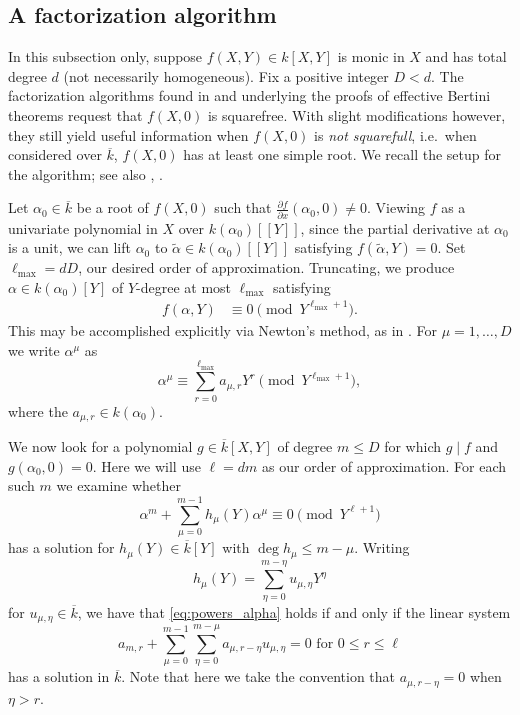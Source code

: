 \documentclass{amsart}
\newcommand{\lmax}{\ell_{\max}}
\theoremstyle{definition}
\numberwithin{equation}{section}
\numberwithin{table}{section}
\begin{document}
\subsection{A factorization algorithm}
\label{sec:factorization_alg}

In this subsection only, suppose $f(X,Y) \in k[X,Y]$ is monic in $X$ and has total degree $d$ (not necessarily homogeneous). Fix a positive integer $D < d$. The factorization algorithms found in \cite{Kaltofen} and \cite[\S 3.1]{CafureMatera} underlying the proofs of effective Bertini theorems \cite[Corollaries 3.2, 3.3]{CafureMatera} request that $f(X,0)$ is squarefree. With slight modifications however, they still yield useful information when $f(X,0)$ is \textit{not squarefull}, i.e.\ when considered over $\overline{k}$, $f(X,0)$ has at least one simple root. We recall the setup for the algorithm; see also \cite[\S 1]{Kaltofen}, \cite[\S 3.1]{CafureMatera}.

Let $\alpha_0 \in \overline{k}$ be a root of $f(X,0)$ such that $\frac{\partial f}{\partial x}(\alpha_0, 0) \neq 0$. Viewing $f$ as a univariate polynomial in $X$ over $k(\alpha_0)[[Y]]$, since the partial derivative at $\alpha_0$ is a unit, we can lift $\alpha_0$ to $\widetilde{\alpha} \in k(\alpha_0)[[Y]]$ satisfying $f(\widetilde{\alpha}, Y) = 0$. Set $\lmax = dD$, our desired order of approximation. Truncating, we produce $\alpha \in k(\alpha_0)[Y]$ of $Y$-degree at most $\lmax$ satisfying
\begin{align*}
	f(\alpha, Y) &\equiv 0 \pmod{Y^{\lmax + 1}}.
\end{align*}
This may be accomplished explicitly via Newton's method, as in \cite{Kaltofen, CafureMatera}. For $\mu = 1, \ldots, D$ we write $\alpha^\mu$ as
\[\alpha^\mu \equiv \sum_{r=0}^{\lmax} a_{\mu, r} Y^r \pmod{Y^{\lmax+1}},\]
where the $a_{\mu, r} \in k(\alpha_0)$. 

We now look for a polynomial $g \in\overline{k}[X,Y]$ of degree $m \leq D$ for which $g \mid f$ and $g(\alpha_0,0) = 0$. Here we will use $\ell = dm$ as our order of approximation. For each such $m$ we examine whether
\begin{equation}\label{eq:powers_alpha}
	\alpha^m + \sum_{\mu=0}^{m-1} h_\mu(Y)\alpha^\mu \equiv 0 \pmod{Y^{\ell + 1}}
\end{equation}
has a solution for $h_\mu(Y) \in \overline{k}[Y]$ with $\deg h_\mu \leq m-\mu$. Writing
\[h_\mu(Y) = \sum_{\eta=0}^{m-\eta} u_{\mu,\eta}Y^\eta\]
for $u_{\mu,\eta} \in \overline{k}$, we have that \eqref{eq:powers_alpha} holds if and only if the linear system
\begin{equation}\label{eq:linear system}
	a_{m,r} + \sum_{\mu=0}^{m-1} \sum_{\eta=0}^{m-\mu} a_{\mu, r-\eta}u_{\mu,\eta} = 0 \text{ for } 0 \leq r \leq \ell
\end{equation}
has a solution in $\overline{k}$. Note that here we take the convention that $a_{\mu, r-\eta} = 0$ when $\eta > r$.
\end{document}
